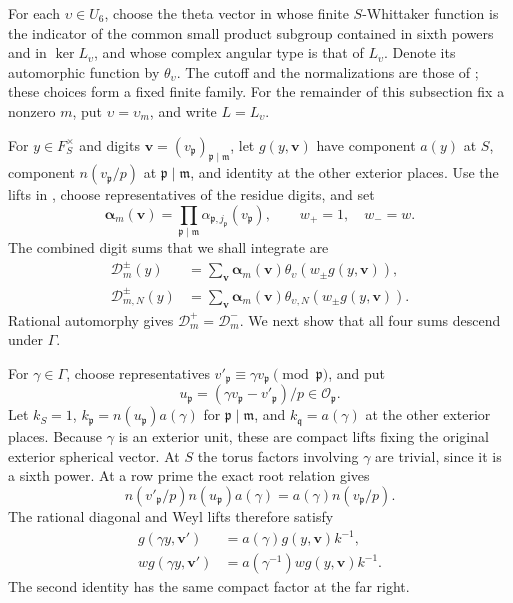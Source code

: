 For each \(\upsilon\in U_6\), choose the theta vector in
 whose finite \(S\)-Whittaker function is the
indicator of the common small product subgroup contained in sixth powers
and in \(\ker L_\upsilon\), and whose complex angular type is that of
\(L_\upsilon\).  Denote its automorphic function by \(\theta_\upsilon\).
The cutoff and the normalizations are those of
; these choices form a fixed finite family.
For the remainder of this subsection fix a nonzero \(m\), put
\(\upsilon=\upsilon_m\), and write \(L=L_\upsilon\).

For \(y\in F_S^\times\) and digits
\(\boldsymbol v=(v_{\mathfrak p})_{\mathfrak p\mid\mathfrak m}\), let
\(g(y,\boldsymbol v)\) have component \(a(y)\) at \(S\), component
\(n(v_{\mathfrak p}/p)\) at \(\mathfrak p\mid\mathfrak m\), and identity
at the other exterior places.  Use the lifts in
, choose representatives of the residue
digits, and set
\[
 \boldsymbol\alpha_m(\boldsymbol v)
   =\prod_{\mathfrak p\mid\mathfrak m}
          \alpha_{\mathfrak p,j_{\mathfrak p}}(v_{\mathfrak p}),
 \qquad w_+=1,\quad w_-=w.
\]
The combined digit sums that we shall integrate are
\begin{equation}\label{eq:reflection-combined-digits}
\begin{split}
 \mathscr D_m^\pm(y)
   &=\sum_{\boldsymbol v}\boldsymbol\alpha_m(\boldsymbol v)
          \theta_\upsilon(w_\pm g(y,\boldsymbol v)),\\
 \mathscr D_{m,N}^\pm(y)
   &=\sum_{\boldsymbol v}\boldsymbol\alpha_m(\boldsymbol v)
          \theta_{\upsilon,N}(w_\pm g(y,\boldsymbol v)).
\end{split}
\end{equation}
Rational automorphy gives \(\mathscr D_m^+=\mathscr D_m^-\).  We next
show that all four sums descend under \(\Gamma\).

For \(\gamma\in\Gamma\), choose representatives
\(v'_{\mathfrak p}\equiv\gamma v_{\mathfrak p}\pmod{\mathfrak p}\), and put
\[
 u_{\mathfrak p}
   =(\gamma v_{\mathfrak p}-v'_{\mathfrak p})/p\in\mathcal O_{\mathfrak p}.
\]
Let \(k_S=1\),
\(k_{\mathfrak p}=n(u_{\mathfrak p})a(\gamma)\) for
\(\mathfrak p\mid\mathfrak m\), and \(k_{\mathfrak q}=a(\gamma)\) at the
other exterior places.  Because \(\gamma\) is an exterior unit, these are
compact lifts fixing the original exterior spherical vector.  At \(S\)
the torus factors involving \(\gamma\) are trivial, since it is a sixth
power.  At a row prime the exact root relation gives
\[
 n(v'_{\mathfrak p}/p)n(u_{\mathfrak p})a(\gamma)
       =a(\gamma)n(v_{\mathfrak p}/p).
\]
The rational diagonal and Weyl lifts therefore satisfy
\begin{equation}\label{eq:reflection-quotient-lifts}
\begin{split}
 g(\gamma y,\boldsymbol v')
   &=a(\gamma)g(y,\boldsymbol v)k^{-1},\\
 w g(\gamma y,\boldsymbol v')
   &=a(\gamma^{-1})w g(y,\boldsymbol v)k^{-1}.
\end{split}
\end{equation}
The second identity has the same compact factor at the far right.

